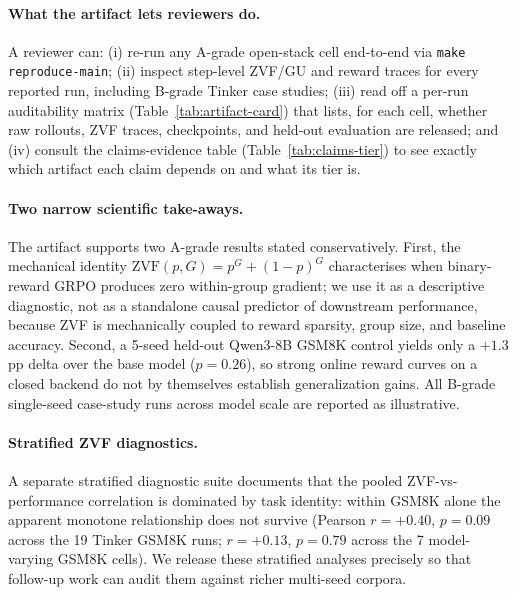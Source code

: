 \paragraph{What the artifact lets reviewers do.}
A reviewer can: (i) re-run any A-grade open-stack cell end-to-end via
\texttt{make reproduce-main}; (ii) inspect step-level ZVF/GU and reward
traces for every reported run, including B-grade Tinker case studies;
(iii) read off a per-run auditability matrix (Table~\ref{tab:artifact-card})
that lists, for each cell, whether raw rollouts, ZVF traces, checkpoints,
and held-out evaluation are released; and (iv) consult the claims-evidence
table (Table~\ref{tab:claims-tier}) to see exactly which artifact each
claim depends on and what its tier is.

\paragraph{Two narrow scientific take-aways.}
The artifact supports two A-grade results stated conservatively. First, the
mechanical identity $\mathrm{ZVF}(p, G) = p^{G} + (1{-}p)^{G}$ characterises
when binary-reward GRPO produces zero within-group gradient; we use it as
a descriptive diagnostic, not as a standalone causal predictor of
downstream performance, because ZVF is mechanically coupled to reward
sparsity, group size, and baseline accuracy. Second, a 5-seed held-out
Qwen3-8B GSM8K control yields only a $+1.3$pp delta over the base model
($p{=}0.26$), so strong online reward curves on a closed backend do not by
themselves establish generalization gains. All B-grade single-seed
case-study runs across model scale are reported as illustrative.

\paragraph{Stratified ZVF diagnostics.}
A separate stratified diagnostic suite documents that the pooled
ZVF-vs-performance correlation is dominated by task identity: within
GSM8K alone the apparent monotone relationship does not survive
(Pearson $r=+0.40$, $p=0.09$ across the 19 Tinker GSM8K runs;
$r=+0.13$, $p=0.79$ across the 7 model-varying GSM8K cells). We
release these stratified analyses precisely so that follow-up work can
audit them against richer multi-seed corpora.
